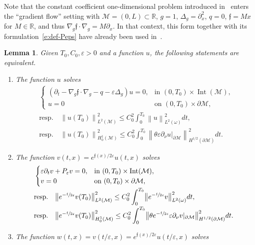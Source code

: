 \documentclass[11pt]{article}
\newcommand{\resp}{resp.\xspace}
\numberwithin{equation}{section}
\newtheorem{lemma}{Lemma}[section]
\theoremstyle{definition}
\newcommand{\M}{\ensuremath{\mathcal M}}
\newcommand{\mb}[1]{\ensuremath{\mathbb{#1}}}
\newcommand{\R}{{\mb{R}}}
\newcommand{\f}{\ensuremath{\mathfrak{f}}}
\DeclareMathOperator{\Int}{Int}
\newcommand\Lap{\Delta_{g}}
\newcommand\nablag{\nabla_{g}}
\newcommand\nor[2]{\left\|#1\right\|_{#2}}
\newcommand\bnor[2]{\bigl\|#1\bigr\|_{#2}}
\let\d\partial
\let\eps\varepsilon
\let\q q
\begin{document}
Note that the constant coefficient one-dimensional problem introduced in~\cite{CG:05} enters the ``gradient flow'' setting with $\M =(0,L)\subset \R$, $g=1$, $\Lap=\d_x^2$, $\q=0$, $\f = M x$ for $M\in \R$, and thus $\nablag \f \cdot \nablag = M \d_x$. In that context, this form together with its formulation~\eqref{e:def-Peps} have already been used in~\cite{CG:05,Gla:10,Lissy:14,Lissy:15}.
\begin{lemma}
\label{lemequiveunif}
Given $T_0, C_0, \eps >0$ and a function $u$, the following statements are equivalent.
\begin{enumerate}
\item The function $u$ solves
\begin{align}
\label{e:heat-transp-eps}
&\begin{cases}
(\d_t - \nablag \f\cdot \nablag -\q - \eps \Delta_g ) u = 0, & \text{in } (0,T_0)\times\Int(\M), \\
u = 0 & \text{on } (0,T_0)\times \d\M,
\end{cases}
\\
\label{e:obs-heat-transp-eps}
&\text{\resp }\quad \nor{u(T_0)}{L^2(\M)}^2 \leq C_0^2\int_0^{T_0}\nor{u}{L^2(\omega)}^2 dt, \\
\label{e:obs-heat-transp-epsboundary}
&\text{\resp }\quad \nor{u(T_0)}{H^1_0(\M)}^2 \leq C_0^2\int_0^{T_0}\nor{\theta \eps \partial_{\nu}u|_{\d\M}}{H^{1/2}(\d\M)}^2 dt.
\end{align}
\item The function $v(t,x)= e^{\f(x)/2\eps}u(t,x)$ solves
\begin{align}
\label{e:heat-transp-eps-Witt}
&\begin{cases}
\eps \partial_t v + P_\eps v =0, & \text{in } (0,T_0)\times\Int(\M), \\
v = 0 & \text{on } (0,T_0)\times \d\M,
\end{cases}
\\[-2pt]
\label{e:obs-heat-transp-eps-Witt}
&\text{\resp }\quad \bnor{e^{-\sfrac{\f}{2\eps}}v(T_0)}{L^2(\M)}^2 \leq C_0^2\int_0^{T_0}\bnor{e^{-\sfrac{\f}{2\eps}}v }{L^2(\omega)}^2 dt, \\[-2pt]
\label{e:obs-heat-transp-eps-Wittboundary}
&\text{\resp }\quad \bnor{e^{-\sfrac{\f}{2\eps}}v(T_0)}{H^1_0(\M)}^2 \leq C_0^2\int_0^{T_0}\bnor{\theta e^{-\sfrac{\f}{2\eps}} \eps \partial_{\nu}v|_{\d\M} }{H^{1/2}(\d\M)}^2 dt.
\end{align}
\item The function $w(t,x) = v(t/\eps, x)= e^{\f(x)/2\eps}u(t/\eps,x)$ solves
\begin{align}

\end{align}
\end{enumerate}
\end{lemma}
\end{document}
